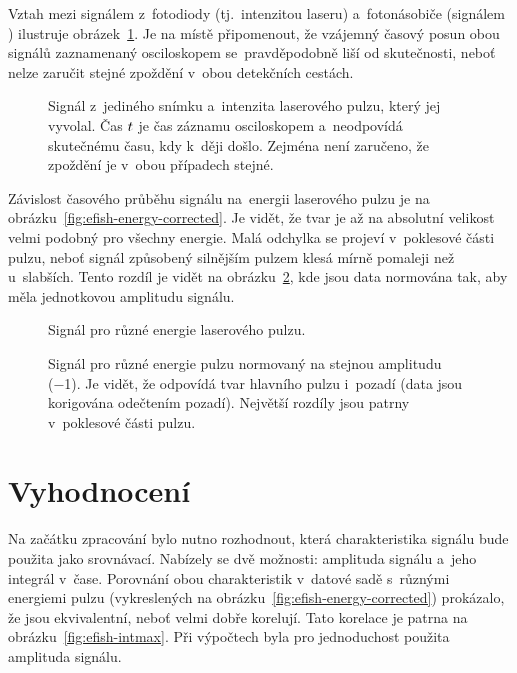 Vztah mezi signálem z~fotodiody (tj.~intenzitou laseru)
a~fotonásobiče (signálem \EFISH{}) ilustruje
obrázek~\ref{fig:efish-singleshot}.
Je na místě připomenout, že vzájemný časový posun obou signálů
zaznamenaný osciloskopem se~pravděpodobně liší od skutečnosti,
neboť nelze zaručit stejné zpoždění v~obou detekčních cestách.

\begin{figure}[htp]
	\centering
	
	\caption{Signál \EFISH{} z~jediného snímku
		a~intenzita laserového pulzu, který jej vyvolal.
		Čas $t$ je čas záznamu osciloskopem a~neodpovídá skutečnému času,
		kdy k~ději došlo.
		Zejména není zaručeno, že zpoždění je v~obou případech stejné.}
	\label{fig:efish-singleshot}
\end{figure}

Závislost časového průběhu signálu \EFISH{} na~energii laserového pulzu
je na obrázku~\ref{fig:efish-energy-corrected}.
Je vidět, že tvar je až na absolutní velikost velmi podobný pro všechny
energie.
Malá odchylka se projeví v~poklesové části pulzu, neboť signál způsobený
silnějším pulzem klesá mírně pomaleji než u~slabších.
Tento rozdíl je vidět na obrázku~\ref{fig:efish-energy-norm},
kde jsou data normována tak, aby měla jednotkovou amplitudu signálu.

\begin{figure}[htp]
	\centering
	
	\caption{Signál \EFISH{} pro různé energie laserového pulzu.}
	\label{fig:efish-energy-corrected}
	\vspace{24pt}
	
	\caption{Signál \EFISH{} pro různé energie pulzu normovaný na stejnou
		amplitudu (\num{-1}).
		Je vidět, že odpovídá tvar hlavního pulzu i~pozadí
		(data jsou korigována odečtením pozadí).
		Největší rozdíly jsou patrny v~poklesové části pulzu.}
	\label{fig:efish-energy-norm}
\end{figure}

\section{Vyhodnocení}
\label{sec:efish-method}
Na začátku zpracování bylo nutno rozhodnout, která charakteristika signálu
\EFISH{} bude použita jako srovnávací.
Nabízely se dvě možnosti: amplituda signálu a~jeho integrál v~čase.
Porovnání obou charakteristik v~datové sadě s~různými energiemi pulzu
(vykreslených na obrázku~\ref{fig:efish-energy-corrected}) prokázalo,
že jsou ekvivalentní, neboť velmi dobře korelují.
Tato korelace je patrna na obrázku~\ref{fig:efish-intmax}.
Při výpočtech byla pro jednoduchost použita amplituda signálu.

